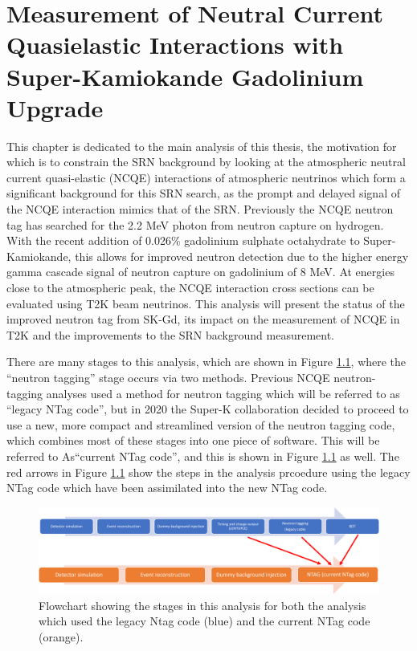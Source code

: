 \chapter{Measurement of Neutral Current Quasielastic
Interactions with Super-Kamiokande Gadolinium Upgrade}
\label{chp:ncqegd}

This chapter is dedicated to the main analysis of this thesis, the motivation for which is to constrain the SRN background by looking at the atmospheric neutral current quasi-elastic (NCQE) interactions of atmospheric neutrinos which form a significant background for this SRN search, as the prompt and delayed signal of the NCQE interaction mimics that of the SRN. Previously the NCQE neutron tag has searched for the 2.2 MeV photon from neutron capture on hydrogen. With the recent addition of 0.026\% gadolinium sulphate octahydrate to Super-Kamiokande, this allows for improved neutron detection due to the higher energy gamma cascade signal of neutron capture on gadolinium of 8 MeV. At energies close to the atmospheric peak, the NCQE interaction cross sections can be evaluated using T2K beam neutrinos. This analysis will present the status of the improved neutron tag from SK-Gd, its impact on the measurement of NCQE in T2K and the improvements to the SRN background measurement.

There are many stages to this analysis, which are shown in Figure \ref{fig:analysis_flowchart}, where the ``neutron tagging'' stage occurs via two methods. Previous NCQE neutron-tagging analyses used a method for neutron tagging which will be referred to as ``legacy NTag code'', but in 2020 the Super-K collaboration decided to proceed to use a new, more compact and streamlined version of the neutron tagging code, which combines most of these stages into one piece of software. This will be referred to As``current NTag code'', and this is shown in Figure \ref{fig:analysis_flowchart} as well. The red arrows in Figure \ref{fig:analysis_flowchart} show the steps in the analysis prcoedure using the legacy NTag code which have been assimilated into the new NTag code.

\begin{figure}
    \includegraphics[width=\textwidth]{Figures/analysis_flowchart.png}
    \caption{Flowchart showing the stages in this analysis for both the analysis which used the legacy Ntag code (blue) and the current NTag code (orange).}
\label{fig:analysis_flowchart}
\end{figure}

